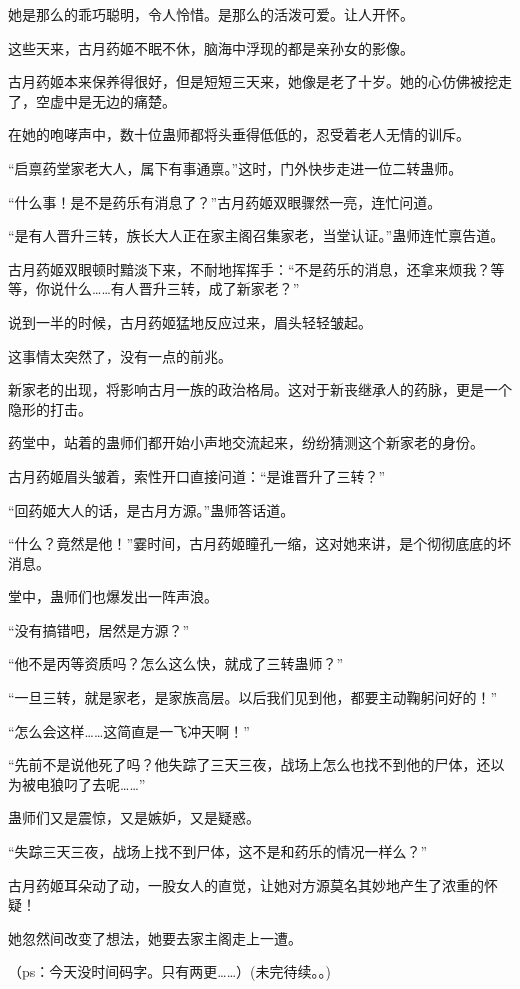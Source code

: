 \begin{this_body}
她是那么的乖巧聪明，令人怜惜。是那么的活泼可爱。让人开怀。

这些天来，古月药姬不眠不休，脑海中浮现的都是亲孙女的影像。

古月药姬本来保养得很好，但是短短三天来，她像是老了十岁。她的心仿佛被挖走了，空虚中是无边的痛楚。

在她的咆哮声中，数十位蛊师都将头垂得低低的，忍受着老人无情的训斥。

“启禀药堂家老大人，属下有事通禀。”这时，门外快步走进一位二转蛊师。

“什么事！是不是药乐有消息了？”古月药姬双眼骤然一亮，连忙问道。

“是有人晋升三转，族长大人正在家主阁召集家老，当堂认证。”蛊师连忙禀告道。

古月药姬双眼顿时黯淡下来，不耐地挥挥手：“不是药乐的消息，还拿来烦我？等等，你说什么……有人晋升三转，成了新家老？”

说到一半的时候，古月药姬猛地反应过来，眉头轻轻皱起。

这事情太突然了，没有一点的前兆。

新家老的出现，将影响古月一族的政治格局。这对于新丧继承人的药脉，更是一个隐形的打击。

药堂中，站着的蛊师们都开始小声地交流起来，纷纷猜测这个新家老的身份。

古月药姬眉头皱着，索性开口直接问道：“是谁晋升了三转？”

“回药姬大人的话，是古月方源。”蛊师答话道。

“什么？竟然是他！”霎时间，古月药姬瞳孔一缩，这对她来讲，是个彻彻底底的坏消息。

堂中，蛊师们也爆发出一阵声浪。

“没有搞错吧，居然是方源？”

“他不是丙等资质吗？怎么这么快，就成了三转蛊师？”

“一旦三转，就是家老，是家族高层。以后我们见到他，都要主动鞠躬问好的！”

“怎么会这样……这简直是一飞冲天啊！”

“先前不是说他死了吗？他失踪了三天三夜，战场上怎么也找不到他的尸体，还以为被电狼叼了去呢……”

蛊师们又是震惊，又是嫉妒，又是疑惑。

“失踪三天三夜，战场上找不到尸体，这不是和药乐的情况一样么？”

古月药姬耳朵动了动，一股女人的直觉，让她对方源莫名其妙地产生了浓重的怀疑！

她忽然间改变了想法，她要去家主阁走上一遭。

（ps：今天没时间码字。只有两更……）(未完待续。。)

\end{this_body}

